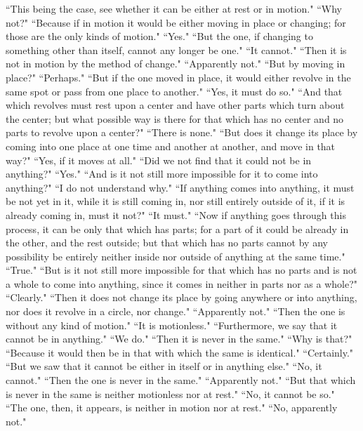 \documentclass[letterpaper,12pt]{article}
\newcommand{\stephpag}[1]{\marginnote{\small\itshape\fontfamily{ppl}\selectfont #1}}
\begin{document}
``This being the case, see whether it can be either at rest or in motion." ``Why not?" \stephpag{c} ``Because if in motion it would be either moving in place or changing; for those are the only kinds of motion." ``Yes." ``But the one, if changing to something other than itself, cannot any longer be one." ``It cannot." ``Then it is not in motion by the method of change." ``Apparently not." ``But by moving in place?" ``Perhaps." ``But if the one moved in place, it would either revolve in the same spot or pass from one place to another." ``Yes, it must do so." ``And that which revolves must rest upon a center and have other parts which turn about the center; \stephpag{d} but what possible way is there for that which has no center and no parts to revolve upon a center?" ``There is none." ``But does it change its place by coming into one place at one time and another at another, and move in that way?" ``Yes, if it moves at all." ``Did we not find that it could not be in anything?" ``Yes." ``And is it not still more impossible for it to come into anything?" ``I do not understand why." ``If anything comes into anything, it must be not yet in it, while it is still coming in, nor still entirely outside of it, if it is already coming in, must it not?" ``It must." \stephpag{e} ``Now if anything goes through this process, it can be only that which has parts; for a part of it could be already in the other, and the rest outside; but that which has no parts cannot by any possibility be entirely neither inside nor outside of anything at the same time." ``True." ``But is it not still more impossible for that which has no parts and is not a whole to come into anything, since it comes in neither in parts nor as a whole?" ``Clearly." \stephpag{139 a} ``Then it does not change its place by going anywhere or into anything, nor does it revolve in a circle, nor change." ``Apparently not." ``Then the one is without any kind of motion." ``It is motionless." ``Furthermore, we say that it cannot be in anything." ``We do." ``Then it is never in the same." ``Why is that?" ``Because it would then be in that with which the same is identical." ``Certainly." ``But we saw that it cannot be either in itself or in anything else." ``No, it cannot." ``Then the one is never in the same." \stephpag{b} ``Apparently not." ``But that which is never in the same is neither motionless nor at rest." ``No, it cannot be so." ``The one, then, it appears, is neither in motion nor at rest." ``No, apparently not."
\end{document}
